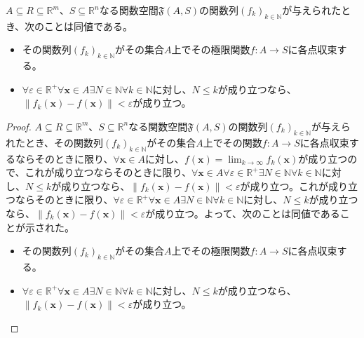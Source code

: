 \documentclass[dvipdfmx]{jsarticle}
\begin{document}
\begin{thm}\label{4.1.11.4}
$A \subseteq R \subseteq \mathbb{R}^{m}$、$S \subseteq \mathbb{R}^{n}$なる関数空間$\mathfrak{F}(A,S)$の関数列$\left( f_{k} \right)_{k \in \mathbb{N}}$が与えられたとき、次のことは同値である。
\begin{itemize}
\item
  その関数列$\left( f_{k} \right)_{k \in \mathbb{N}}$がその集合$A$上でその極限関数$f:A \rightarrow S$に各点収束する。
\item
  $\forall\varepsilon \in \mathbb{R}^{+}\forall\mathbf{x} \in A\exists N \in \mathbb{N}\forall k \in \mathbb{N}$に対し、$N \leq k$が成り立つなら、$\left\| f_{k}\left( \mathbf{x} \right) - f\left( \mathbf{x} \right) \right\| < \varepsilon$が成り立つ。
\end{itemize}
\end{thm}
\begin{proof}
$A \subseteq R \subseteq \mathbb{R}^{m}$、$S \subseteq \mathbb{R}^{n}$なる関数空間$\mathfrak{F}(A,S)$の関数列$\left( f_{k} \right)_{k \in \mathbb{N}}$が与えられたとき、その関数列$\left( f_{k} \right)_{k \in \mathbb{N}}$がその集合$A$上でその関数$f:A \rightarrow S$に各点収束するならそのときに限り、$\forall\mathbf{x} \in A$に対し、$f\left( \mathbf{x} \right) = \lim_{k \rightarrow \infty}{f_{k}\left( \mathbf{x} \right)}$が成り立つので、これが成り立つならそのときに限り、$\forall\mathbf{x} \in A\forall\varepsilon \in \mathbb{R}^{+}\exists N \in \mathbb{N}\forall k \in \mathbb{N}$に対し、$N \leq k$が成り立つなら、$\left\| f_{k}\left( \mathbf{x} \right) - f\left( \mathbf{x} \right) \right\| < \varepsilon$が成り立つ。これが成り立つならそのときに限り、$\forall\varepsilon \in \mathbb{R}^{+}\forall\mathbf{x} \in A\exists N \in \mathbb{N}\forall k \in \mathbb{N}$に対し、$N \leq k$が成り立つなら、$\left\| f_{k}\left( \mathbf{x} \right) - f\left( \mathbf{x} \right) \right\| < \varepsilon$が成り立つ。よって、次のことは同値であることが示された。
\begin{itemize}
\item
  その関数列$\left( f_{k} \right)_{k \in \mathbb{N}}$がその集合$A$上でその極限関数$f:A \rightarrow S$に各点収束する。
\item
  $\forall\varepsilon \in \mathbb{R}^{+}\forall\mathbf{x} \in A\exists N \in \mathbb{N}\forall k \in \mathbb{N}$に対し、$N \leq k$が成り立つなら、$\left\| f_{k}\left( \mathbf{x} \right) - f\left( \mathbf{x} \right) \right\| < \varepsilon$が成り立つ。
\end{itemize}
\end{proof}
\end{document}
